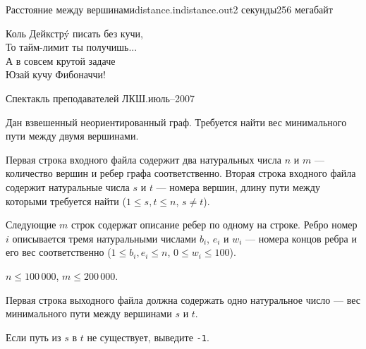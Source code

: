 \begin{problem}{Расстояние между вершинами}{distance.in}{distance.out}{2 секунды}{256 мегабайт}

\epigraph{
Коль Дейкстр\'y писать без кучи,\\
То тайм-лимит ты получишь...\\
А в совсем крутой задаче\\
Юзай кучу Фибоначчи!
}{
Спектакль преподавателей ЛКШ.июль--2007
}

Дан взвешенный неориентированный граф. Требуется найти вес минимального пути между двумя вершинами.

\InputFile

Первая строка входного файла содержит два натуральных числа $n$ и $m$ --- 
количество вершин и ребер графа соответственно. Вторая строка входного файла 
содержит натуральные числа $s$ и $t$ --- номера вершин, длину пути между 
которыми требуется найти ($1 \le s, t \le n$, $s \ne t$).

Следующие $m$ строк содержат описание ребер по одному на строке. Ребро номер 
$i$ описывается тремя натуральными числами $b_i$, $e_i$ и $w_i$ --- номера 
концов ребра и его вес соответственно ($1 \le b_i, e_i \le n$, $0 \le w_i \le 100$).

$n \le 100\,000$, $m \le 200\,000$.

\OutputFile

Первая строка выходного файла должна содержать одно натуральное число --- 
вес минимального пути между вершинами $s$ и $t$.

Если путь из $s$ в $t$ не существует, выведите \texttt{-1}.

\Example

\begin{example}
%
\end{example}

\end{problem}
